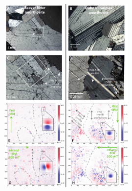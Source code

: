\begin{figure}
\includegraphics[width=0.6\textwidth]{figure/Zhang2022/Petro_QDM_full.pdf}

\end{figure}
